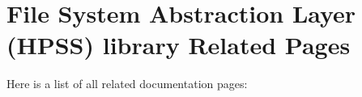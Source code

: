 \section{File System Abstraction Layer (HPSS) library Related Pages}
Here is a list of all related documentation pages:\begin{CompactList}
\item {}

\end{CompactList}
